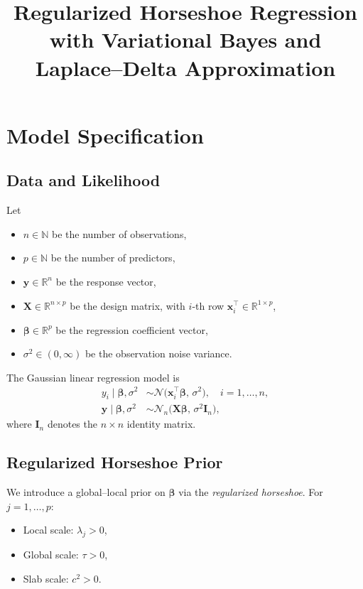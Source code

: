\documentclass[11pt]{article}
\title{Regularized Horseshoe Regression with Variational Bayes and Laplace--Delta Approximation}
\author{}
\date{}
\newcommand{\vect}[1]{\boldsymbol{#1}}
\newcommand{\mat}[1]{\mathbf{#1}}
\newcommand{\R}{\mathbb{R}}
\newcommand{\N}{\mathcal{N}}
\begin{document}
\maketitle

\section{Model Specification}

\subsection{Data and Likelihood}

Let
\begin{itemize}
  \item $n \in \mathbb{N}$ be the number of observations,
  \item $p \in \mathbb{N}$ be the number of predictors,
  \item $\vect{y} \in \R^n$ be the response vector,
  \item $\mat{X} \in \R^{n \times p}$ be the design matrix, with $i$-th row $\vect{x}_i^\top \in \R^{1 \times p}$,
  \item $\vect{\beta} \in \R^p$ be the regression coefficient vector,
  \item $\sigma^2 \in (0,\infty)$ be the observation noise variance.
\end{itemize}

The Gaussian linear regression model is
\begin{align}
  y_i \mid \vect{\beta}, \sigma^2 
  &\sim \N\big(\vect{x}_i^\top \vect{\beta}, \,\sigma^2\big),
  \quad i = 1,\dots,n, \\
  \vect{y} \mid \vect{\beta}, \sigma^2
  &\sim \N_n\big(\mat{X}\vect{\beta},\, \sigma^2 \mat{I}_n\big),
\end{align}
where $\mat{I}_n$ denotes the $n \times n$ identity matrix.

\subsection{Regularized Horseshoe Prior}

We introduce a global--local prior on $\vect{\beta}$ via the \emph{regularized horseshoe}. For $j=1,\dots,p$:

\begin{itemize}
  \item Local scale: $\lambda_j > 0$,
  \item Global scale: $\tau > 0$,
  \item Slab scale: $c^2 > 0$.
\end{itemize}
\end{document}
